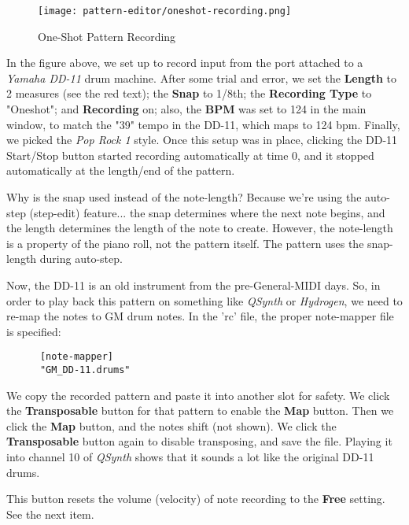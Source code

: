 \begin{figure}[H]
   \centering 
   \texttt{[image: pattern-editor/oneshot-recording.png]}
   \caption{One-Shot Pattern Recording}
   \label{fig:pattern_editor_oneshot_recording}
\end{figure}

   In the figure above, we set up to record input from the port attached to a
   \textsl{Yamaha DD-11} drum machine.  After some trial and error,
   we set the \textbf{Length} to 2 measures (see the red text); the
   \textbf{Snap} to 1/8th; the \textbf{Recording Type} to "Oneshot"; and
   \textbf{Recording} on; also, the \textbf{BPM} was set to 124 in the main
   window, to match the "39" tempo in the DD-11, which maps to 124 bpm.
   Finally, we picked the \textsl{Pop Rock 1} style.  
   Once this setup was in place, clicking the DD-11 Start/Stop button started
   recording automatically at time 0, and it stopped automatically at the
   length/end of the pattern.

   Why is the snap used instead of the note-length?  Because we're using the
   auto-step (step-edit) feature... the snap determines where the next note
   begins, and the length determines the length of the note to create.
   However, the note-length is a property of the piano roll, not the pattern
   itself.  The pattern uses the snap-length during auto-step.

   Now, the DD-11 is an old instrument from the pre-General-MIDI days.
   So, in order to play back this pattern on something like
   \textsl{QSynth} or \textsl{Hydrogen}, we need to re-map the notes to GM drum
   notes.  In the 'rc' file, the proper note-mapper file is specified:

   \begin{verbatim}
      [note-mapper]
      "GM_DD-11.drums"
   \end{verbatim}

   We copy the recorded pattern and paste it into another slot for safety.
   We click the \textbf{Transposable} button for that pattern to enable the
   \textbf{Map} button.  Then we click the \textbf{Map} button, and the notes
   shift (not shown).  
   We click the \textbf{Transposable} button again to disable transposing,
   and save the file.
   Playing it into channel 10 of \textsl{QSynth} shows that it sounds a lot
   like the original DD-11 drums.

   This button resets the volume (velocity)
   of note recording to the \textbf{Free} setting.
   See the next item.

